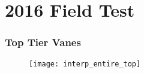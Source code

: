 \documentclass[mathserif]{beamer}
\begin{document}

\section{2016 Field Test}
%
%


\begin{frame}
 \frametitle{Top Tier Vanes}
    \begin{figure}[htb]
     \centering
     \texttt{[image: interp\_entire\_top]}
    \end{figure}


   
 

\end{frame}
\end{document}
